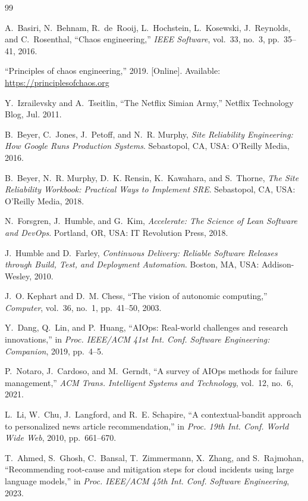\begin{thebibliography}{99}

A.~Basiri, N.~Behnam, R.~de~Rooij, L.~Hochstein, L.~Kosewski, J.~Reynolds, and C.~Rosenthal,
``Chaos engineering,'' \emph{IEEE Software}, vol.~33, no.~3, pp.~35--41, 2016.

``Principles of chaos engineering,'' 2019. [Online]. Available: \url{https://principlesofchaos.org}

Y.~Izrailevsky and A.~Tseitlin, ``The Netflix Simian Army,'' Netflix Technology Blog, Jul. 2011.

B.~Beyer, C.~Jones, J.~Petoff, and N.~R. Murphy, \emph{Site Reliability Engineering: How Google
Runs Production Systems}. Sebastopol, CA, USA: O'Reilly Media, 2016.

B.~Beyer, N.~R. Murphy, D.~K. Rensin, K.~Kawahara, and S.~Thorne, \emph{The Site Reliability
Workbook: Practical Ways to Implement SRE}. Sebastopol, CA, USA: O'Reilly Media, 2018.

N.~Forsgren, J.~Humble, and G.~Kim, \emph{Accelerate: The Science of Lean Software and DevOps}.
Portland, OR, USA: IT Revolution Press, 2018.

J.~Humble and D.~Farley, \emph{Continuous Delivery: Reliable Software Releases through Build, Test,
and Deployment Automation}. Boston, MA, USA: Addison-Wesley, 2010.

J.~O. Kephart and D.~M. Chess, ``The vision of autonomic computing,'' \emph{Computer}, vol.~36,
no.~1, pp.~41--50, 2003.

Y.~Dang, Q.~Lin, and P.~Huang, ``AIOps: Real-world challenges and research innovations,'' in
\emph{Proc. IEEE/ACM 41st Int. Conf. Software Engineering: Companion}, 2019, pp.~4--5.

P.~Notaro, J.~Cardoso, and M.~Gerndt, ``A survey of AIOps methods for failure management,''
\emph{ACM Trans. Intelligent Systems and Technology}, vol.~12, no.~6, 2021.

L.~Li, W.~Chu, J.~Langford, and R.~E. Schapire, ``A contextual-bandit approach to personalized news
article recommendation,'' in \emph{Proc. 19th Int. Conf. World Wide Web}, 2010, pp.~661--670.

T.~Ahmed, S.~Ghosh, C.~Bansal, T.~Zimmermann, X.~Zhang, and S.~Rajmohan, ``Recommending root-cause
and mitigation steps for cloud incidents using large language models,'' in \emph{Proc. IEEE/ACM 45th
Int. Conf. Software Engineering}, 2023.


\end{thebibliography}
